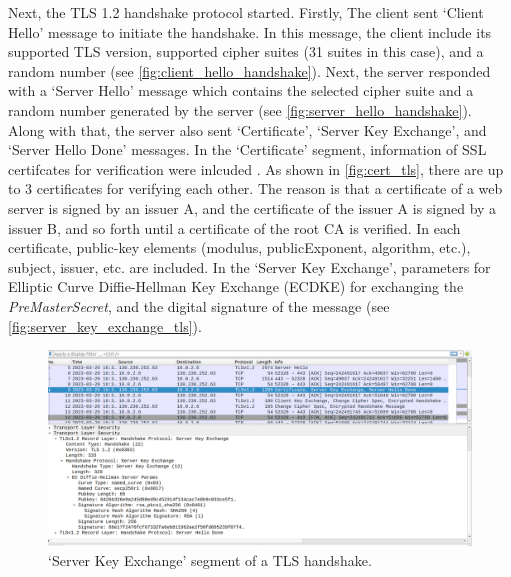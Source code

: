 Next, the TLS 1.2 handshake protocol started. Firstly, The client sent `Client Hello' message to
initiate the handshake. In this message, the client include its supported TLS version, supported
cipher suites (31 suites in this case), and a random number (see \autoref{fig:client_hello_handshake}). Next, the server
responded with a `Server Hello' message which contains the selected cipher suite and a
random number generated by the server (see \autoref{fig:server_hello_handshake}). Along with
that, the server also sent `Certificate', `Server Key Exchange', and `Server Hello Done'
messages. In the `Certificate' segment, information of SSL certifcates for verification were inlcuded
. As shown in \autoref{fig:cert_tls}, there are up to 3 certificates for verifying each other.
The reason is that a certificate of a web server is signed by an issuer A, and the certificate
of the issuer A is signed by a issuer B, and so forth until a certificate of the root CA is verified.
In each certificate, public-key elements (modulus, publicExponent, algorithm, etc.), subject, issuer,
etc. are included. In the `Server Key Exchange', parameters for Elliptic Curve Diffie-Hellman
Key Exchange (ECDKE) for exchanging the \emph{PreMasterSecret}, and the digital signature of
the message (see \autoref{fig:server_key_exchange_tls}).


\begin{figure}
    \centering
    \includegraphics[height=\textheight,width=\textwidth,keepaspectratio]
    {figures/server_key_exchange.png}
    \caption{`Server Key Exchange' segment of a TLS handshake.}
    \label{fig:server_key_exchange_tls}
\end{figure}

